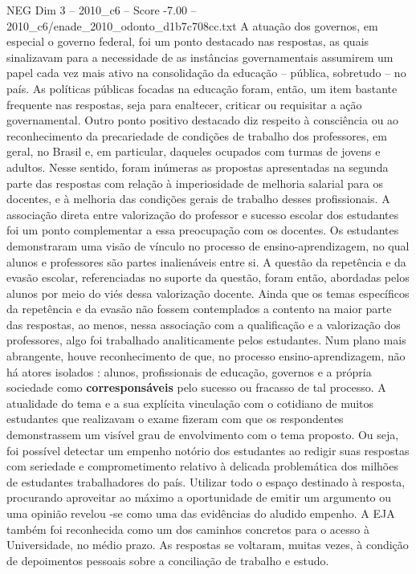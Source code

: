\begin{textsample}{NEG Dim 3 – 2010\_c6 – Score -7.00 – 2010\_c6/enade\_2010\_odonto\_d1b7c708cc.txt}
A atuação dos governos, em especial o governo federal, foi um ponto destacado nas respostas, as quais sinalizavam para a necessidade de as instâncias governamentais assumirem um papel cada vez mais ativo na consolidação da educação – pública, sobretudo – no país.
As políticas públicas focadas na educação foram, então, um item bastante frequente nas respostas, seja para enaltecer, criticar ou requisitar a ação governamental.
Outro ponto positivo destacado diz respeito à consciência ou ao reconhecimento da precariedade de condições de trabalho dos professores, em geral, no Brasil e, em particular, daqueles ocupados com turmas de jovens e adultos.
Nesse sentido, foram inúmeras as propostas apresentadas na segunda parte das respostas com relação à imperiosidade de melhoria salarial para os docentes, e à melhoria das condições gerais de trabalho desses profissionais.
A associação direta entre valorização do professor e sucesso escolar dos estudantes foi um ponto complementar a essa preocupação com os docentes.
Os estudantes demonstraram uma visão de vínculo no processo de ensino-aprendizagem, no qual alunos e professores são partes inalienáveis entre si.
A questão da repetência e da evasão escolar, referenciadas no suporte da questão, foram então, abordadas pelos alunos por meio do viés dessa valorização docente.
Ainda que os temas específicos da repetência e da evasão não fossem contemplados a contento na maior parte das respostas, ao menos, nessa associação com a qualificação e a valorização dos professores, algo foi trabalhado analiticamente pelos estudantes.
Num plano mais abrangente, houve reconhecimento de que, no processo ensino-aprendizagem, não há atores isolados : alunos, profissionais de educação, governos e a própria sociedade como \textbf{corresponsáveis} pelo sucesso ou fracasso de tal processo.
A atualidade do tema e a sua explícita vinculação com o cotidiano de muitos estudantes que realizavam o exame fizeram com que os respondentes demonstrassem um visível grau de envolvimento com o tema proposto.
Ou seja, foi possível detectar um empenho notório dos estudantes ao redigir suas respostas com seriedade e comprometimento relativo à delicada problemática dos milhões de estudantes trabalhadores do país.
Utilizar todo o espaço destinado à resposta, procurando aproveitar ao máximo a oportunidade de emitir um argumento ou uma opinião revelou -se como uma das evidências do aludido empenho.
A EJA também foi reconhecida como um dos caminhos concretos para o acesso à Universidade, no médio prazo.
As respostas se voltaram, muitas vezes, à condição de depoimentos pessoais sobre a conciliação de trabalho e estudo.

\end{textsample}
